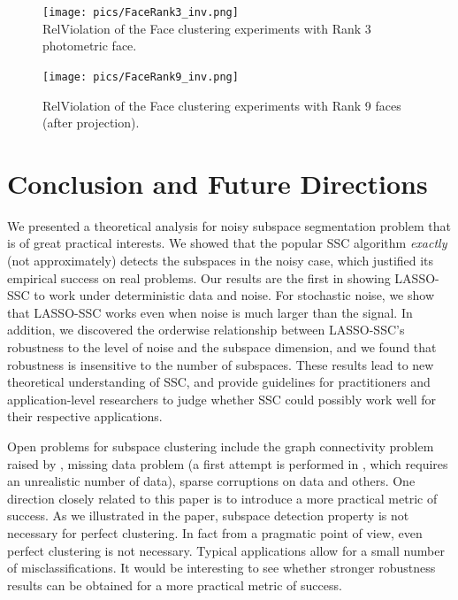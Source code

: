 \documentclass[twoside,11pt]{article}
\numberwithin{equation}{section}
\begin{document}
\begin{figure}[ht]
\begin{minipage}[t]{0.48\textwidth}
  \centering
  \texttt{[image: pics/FaceRank3\_inv.png]}\\
  \caption[Effects of number of subspace $L$.]{RelViolation of the Face clustering experiments with Rank 3 photometric face. }\label{fig:Rank3Face}
\end{minipage}
\hspace{0.02\textwidth}
\begin{minipage}[t]{0.48\textwidth}
  \centering
  \texttt{[image: pics/FaceRank9\_inv.png]}\\
  \caption[Effects of cluster rank $d$.]{RelViolation of the Face clustering experiments with Rank 9 faces (after projection).  }\label{fig:Rank9Face}
\end{minipage}
\end{figure}



\section{Conclusion and Future Directions}\label{sec:conclusion}
We presented a theoretical analysis for noisy subspace segmentation problem that is of great practical interests. We showed that the popular SSC algorithm {\em exactly} (not approximately) detects the subspaces in the noisy case, which justified its empirical success on real problems. Our results are the first in showing LASSO-SSC to work under deterministic data and noise. For stochastic noise, we show that LASSO-SSC works even when noise is much larger than the signal. In addition, we discovered the orderwise relationship between LASSO-SSC's robustness to the level of noise and the subspace dimension, and we found that robustness is insensitive to the number of subspaces.
These results lead to new theoretical understanding of SSC, and
 provide guidelines for practitioners and application-level researchers to judge whether SSC could possibly work well for their respective applications.

Open problems for subspace clustering include the graph connectivity problem raised by \citet{nasihatkon2011graph}, missing data problem (a first attempt is performed in \citet{eriksson2011high_rankMC}, which requires an unrealistic number of data), sparse corruptions on data and others. One direction closely related to this paper is to introduce  a more practical metric of success. As we illustrated in the paper, subspace detection property is not necessary for perfect clustering. In fact from a pragmatic point of view, even perfect clustering is not necessary. Typical applications allow for a small number of misclassifications. It would be interesting to see whether stronger robustness results can be obtained for a more practical metric of success.
\end{document}
